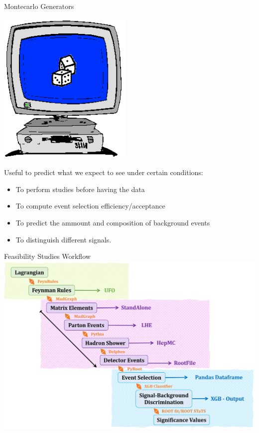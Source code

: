 \documentclass{bredelebeamer}
\begin{document}
\begin{frame}{Montecarlo Generators}
	

	\begin{center}
		\includegraphics[scale=0.5]{A1}
	\end{center}

	Useful to predict what we expect to see under certain conditions:
	\begin{itemize}
		\item To perform studies before having the data
		\item To compute event selection efficiency/acceptance
		\item  To predict the ammount and composition of background events
		\item To distinguish different signals. 
	\end{itemize}
	
\end{frame}

\begin{frame}{Feasibility Studies Workflow}
	\includegraphics[width=1.0\linewidth]{Workflow.png}
\end{frame}
\end{document}
